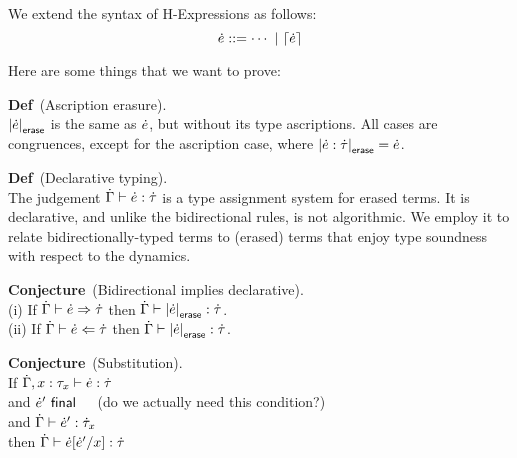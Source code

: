 %
%
%

We extend the syntax of H-Expressions as follows:
\[
\dot{e} ::= \cdots~|~\lceil\dot{e}\rceil
\]

Here are some things that we want to prove:

\textbf{Def}~(Ascription erasure). 
\\
$\left|\dot{e}\right|_\textsf{erase}$ is the same as $\dot{e}$, but without its type ascriptions.
%
All cases are congruences, except for the ascription case, where $\left|\dot{e} : \dot{\tau}\right|_\textsf{erase} = \dot{e}$.

\textbf{Def}~(Declarative typing).
\\
The judgement $\dot{\Gamma} \vdash \dot{e} : \dot{\tau}$ is a type assignment
system for erased terms.  It is declarative, and unlike the
bidirectional rules, is not algorithmic.
%
We employ it to relate bidirectionally-typed terms to (erased) terms
that enjoy type soundness with respect to the dynamics.

\textbf{Conjecture}~(Bidirectional implies declarative).
\\
(i) If $\dot{\Gamma} \vdash \dot{e} \Rightarrow \dot{\tau}$ then $\dot{\Gamma} \vdash \left|\dot{e}\right|_\textsf{erase} : \dot{\tau}$.
\\
(ii) If $\dot{\Gamma} \vdash \dot{e} \Leftarrow \dot{\tau}$ then $\dot{\Gamma} \vdash \left|\dot{e}\right|_\textsf{erase} : \dot{\tau}$.

\textbf{Conjecture}~(Substitution).
\\
If $\dot{\Gamma}, x : \tau_x \vdash \dot{e} : \dot{\tau}$
\\
and $\dot{e}'~\textsf{final}$~~~(do we actually need this condition?)
\\
and $\dot{\Gamma} \vdash \dot{e}' : \dot{\tau}_x$
\\
then $\dot{\Gamma} \vdash \dot{e}[\dot{e}' / x] : \dot{\tau}$


